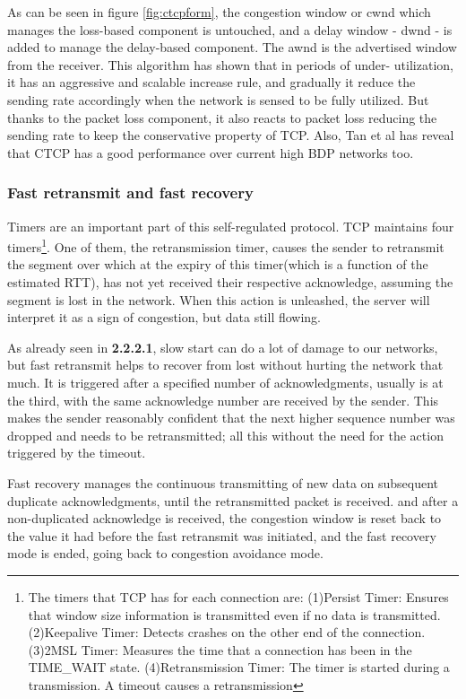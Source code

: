 As can be seen in figure \ref{fig:ctcpform}, the congestion window or cwnd
which manages the loss-based component is untouched, and a delay window - dwnd
- is added to manage the delay-based component.  The awnd is the advertised
window from the receiver. This algorithm has shown that in periods of under-
utilization, it has an aggressive and scalable increase rule, and gradually it
reduce the sending rate accordingly when the network is sensed to be fully
utilized. But thanks to the packet loss component, it also reacts to packet
loss reducing the sending rate to keep the conservative property of TCP. Also,
Tan et al\cite{Tan06compoundtcp} has reveal that CTCP has a good performance
over current high BDP networks too.

\subsubsection{Fast retransmit and fast recovery} 
Timers are an important part of this self-regulated protocol. TCP maintains
four timers\footnote{The timers that TCP has for each connection are:
(1)Persist Timer: Ensures that window size information is transmitted even  if
no data is transmitted. (2)Keepalive Timer: Detects crashes on the other end
of the connection. (3)2MSL Timer: Measures the time that a connection has been
in the TIME\_WAIT state. (4)Retransmission Timer: The timer is started during
a transmission. A timeout causes a retransmission}. One of them, the
retransmission timer, causes the sender to retransmit the segment over which
at the expiry of this timer(which is a function of the estimated RTT), has not
yet received their respective acknowledge, assuming the segment is lost in the
network. When this action is unleashed, the server will interpret it as a sign
of congestion, but data still flowing.

As already seen in \textbf{2.2.2.1}, slow start can do a lot of damage to our
networks, but fast retransmit helps to recover from lost without hurting the
network that much. It is triggered after a specified number of
acknowledgments, usually is at the third, with the same acknowledge number are
received by the sender. This makes the sender reasonably confident that
the next higher sequence number was dropped and needs to be retransmitted; all
this without the need for the action triggered by the timeout.

Fast recovery manages the continuous transmitting of new data on subsequent
duplicate acknowledgments, until the retransmitted packet is received. and
after a non-duplicated acknowledge is received, the congestion window is reset
back to the value it had before the fast retransmit was initiated, and the
fast recovery mode is ended, going back to congestion avoidance mode.
